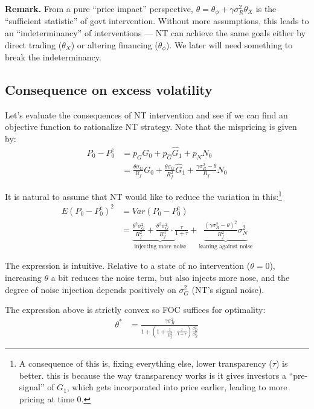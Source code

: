\documentclass[12pt]{article}
\begin{document}
\textbf{Remark.} From a pure ``price impact'' perspective, $\theta = \theta_\phi + \gamma \sigma_R^2 \theta_X$ is the ``sufficient statistic'' of govt intervention. Without more assumptions, this leads to an ``indeterminancy'' of interventions --- NT can achieve the same goals either by direct trading ($\theta_X$) or altering financing ($\theta_\phi$). We later will need something to break the indeterminancy. 

\subsection{Consequence on excess volatility}

Let's evaluate the consequences of NT intervention and see if we can find an objective function to rationalize NT strategy. Note that the mispricing is given by:
\begin{align*}
    P_0 - P_0^e & = p_G G_0 + p_{\hat{G}} \hat{G}_1 + p_N N_0 \\
    & = \frac{\theta \sigma_G}{R_f} G_0 + \frac{\theta \sigma_G}{R_f^2} \hat{G}_1 + \frac{\gamma \sigma_R^2 - \theta}{R_f} N_0
\end{align*}

It is natural to assume that NT would like to reduce the variation in this:\footnote{A consequence of this is, fixing everything else, lower transparency ($\tau$) is better. this is because the way transparency works is it gives investors a ``pre-signal'' of $G_1$, which gets incorporated into price earlier, leading to more pricing at time 0.}
\begin{align*}
    E(P_0 - P_0^e)^2 & = Var(P_0 - P_0^e) \\
    & = \underbrace{\frac{\theta^2 \sigma_G^2}{R_f^2} + \frac{\theta^2 \sigma_G^2}{R_f^4} \cdot \frac{\tau}{1+\tau}}_\text{injecting more noise} + \underbrace{\frac{(\gamma \sigma_R^2 - \theta)^2}{R_f^2} \sigma_N^2}_\text{leaning against noise}
\end{align*}

The expression is intuitive. Relative to a state of no intervention ($\theta = 0$), increasing $\theta$ a bit reduces the noise term, but also injects more nose, and the degree of noise injection depends positively on $\sigma_G^2$ (NT's signal noise). 

The expression above is strictly convex so FOC suffices for optimality:
\begin{align*}
    \theta^* & = \frac{\gamma \sigma_R^2}{1 + \left(1 + \frac{1}{R_f^2} \cdot \frac{\tau}{1+\tau} \right) \frac{\sigma_G^2}{\sigma_N^2}}
\end{align*}
\end{document}
